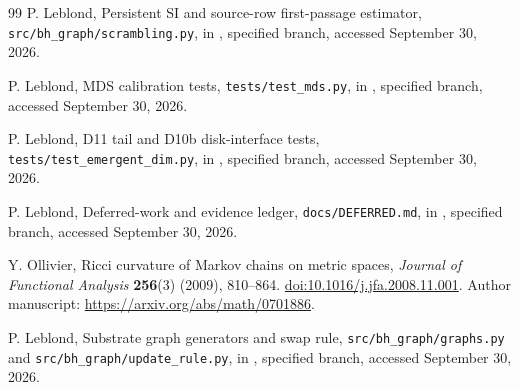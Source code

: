 \documentclass[11pt,letterpaper]{article}
\theoremstyle{definition}
\theoremstyle{remark}
\begin{document}
\begin{thebibliography}{99}
P. Leblond, Persistent SI and source-row first-passage estimator, \texttt{src/bh\_graph/scrambling.py}, in \cite{leblondBranch}, specified branch, accessed September 30, 2026.

P. Leblond, MDS calibration tests, \texttt{tests/test\_mds.py}, in \cite{leblondBranch}, specified branch, accessed September 30, 2026.

P. Leblond, D11 tail and D10b disk-interface tests, \texttt{tests/test\_emergent\_dim.py}, in \cite{leblondBranch}, specified branch, accessed September 30, 2026.

P. Leblond, Deferred-work and evidence ledger, \texttt{docs/DEFERRED.md}, in \cite{leblondBranch}, specified branch, accessed September 30, 2026.

Y. Ollivier, Ricci curvature of Markov chains on metric spaces, \emph{Journal of Functional Analysis} \textbf{256}(3) (2009), 810--864. \href{https://doi.org/10.1016/j.jfa.2008.11.001}{doi:10.1016/j.jfa.2008.11.001}. Author manuscript: \url{https://arxiv.org/abs/math/0701886}.

P. Leblond, Substrate graph generators and swap rule, \texttt{src/bh\_graph/graphs.py} and \texttt{src/bh\_graph/update\_rule.py}, in \cite{leblondBranch}, specified branch, accessed September 30, 2026.
\end{thebibliography}
\end{document}
